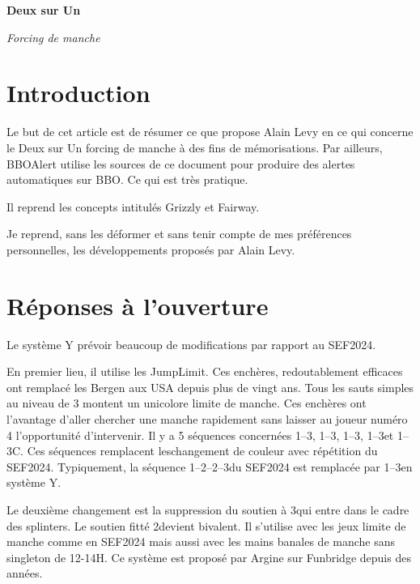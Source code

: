 \documentclass[a4paper,12pt, french, twocolumn]{article}
\newcommand{\T}{\Cl}
\newcommand{\K}{\Di}
\newcommand{\C}{\He}
\renewcommand{\P}{\Sp}
\begin{document}
 {
 \centering

 {\huge\bfseries Deux sur Un\par}

 {\Large\itshape Forcing de manche\par}
}





\section*{Introduction}
Le but de cet article est de résumer ce que propose Alain Levy en ce qui concerne le Deux sur Un forcing de manche à des fins de mémorisations.
Par ailleurs, BBOAlert utilise les sources de ce document pour produire des alertes automatiques sur BBO. Ce qui est très pratique.

Il reprend les concepts intitulés Grizzly et Fairway.

Je reprend, sans les déformer et sans tenir compte de mes préférences personnelles, les développements proposés par Alain Levy.


\section*{Réponses à l'ouverture}

Le système Y prévoir beaucoup de modifications par rapport au SEF2024.

En premier lieu, il utilise les JumpLimit. Ces enchères, redoutablement efficaces ont remplacé les Bergen aux USA depuis plus de vingt ans. Tous les sauts simples au niveau de 3 montent un unicolore limite de manche. Ces enchères ont l'avantage d'aller chercher une manche rapidement sans laisser au joueur numéro 4 l'opportunité d'intervenir. Il y a 5 séquences concernées 1\C--3\T, 1\C--3\K, 1\P--3\T, 1\P--3\K et 1\P--3C. Ces séquences remplacent leschangement de couleur avec répétition du SEF2024. Typiquement, la séquence 1\P--2\T--2\P--3\T du SEF2024 est remplacée par 1\P--3\T en système Y.

Le deuxième changement est la suppression du soutien à 3\NT qui entre dans le cadre des splinters. Le soutien fitté 2\NT devient bivalent. Il s'utilise avec les jeux limite de manche comme en SEF2024 mais aussi avec les mains banales de manche sans singleton de 12-14H. Ce système est proposé par Argine sur Funbridge depuis des années.
\end{document}
